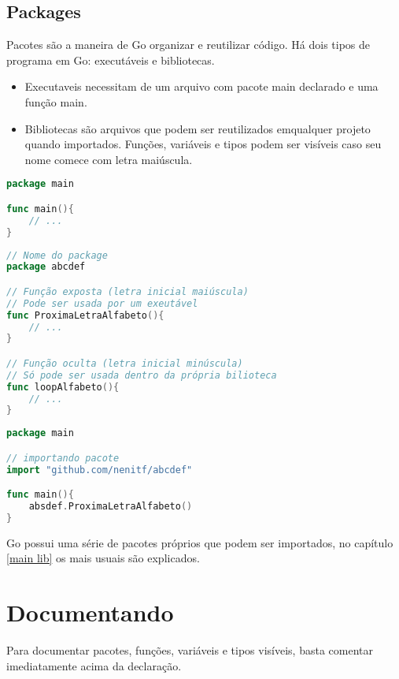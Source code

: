\documentclass{apostila}
\begin{document}
\section{Packages}
Pacotes são a maneira de Go organizar e reutilizar código\cite[18]{igo}. Há dois tipos de programa em Go: executáveis e bibliotecas\cite[18]{igo}.

\begin{itemize}
    \item Executaveis necessitam de um arquivo com pacote main declarado e uma função main\cite[8]{cod3r}.
    \item Bibliotecas são arquivos que podem ser reutilizados emqualquer projeto quando importados. Funções, variáveis e tipos  podem ser visíveis caso seu nome comece com letra maiúscula\cite[106]{igo}.
\end{itemize}

\begin{lstlisting}[language=go,caption=Executável]
package main

func main(){
    // ...
}
\end{lstlisting}

\begin{lstlisting}[language=go,caption=Biblioteca em \$GOPATH/src/github.com/nenitf/abcdef]
// Nome do package
package abcdef

// Função exposta (letra inicial maiúscula)
// Pode ser usada por um exeutável
func ProximaLetraAlfabeto(){
    // ...
}

// Função oculta (letra inicial minúscula)
// Só pode ser usada dentro da própria bilioteca
func loopAlfabeto(){
    // ...
}
\end{lstlisting}

\begin{lstlisting}[language=go,caption=Executável utilizando biblioteca abcdef]
package main

// importando pacote
import "github.com/nenitf/abcdef"

func main(){
    absdef.ProximaLetraAlfabeto()
}
\end{lstlisting}
Go possui uma série de pacotes próprios que podem ser importados, no capítulo \ref{main lib} os mais usuais são explicados.











\chapter{Documentando}
Para documentar pacotes, funções, variáveis e tipos visíveis, basta comentar imediatamente acima da declaração\cite[80]{goia}.
\end{document}
